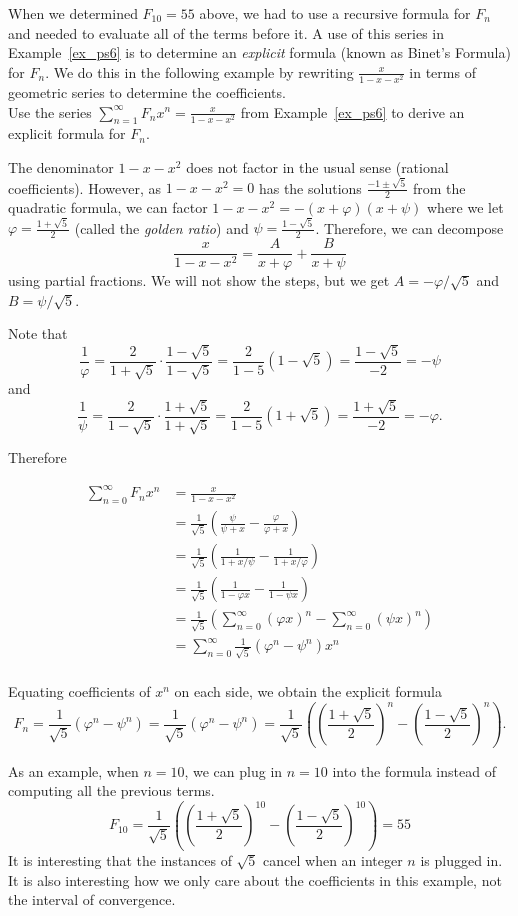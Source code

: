 When we determined $F_{10}=55$ above, we had to use a recursive formula for $F_n$ and needed to evaluate all of the terms before it.  A use of this series in Example~\ref{ex_ps6} is to determine an \emph{explicit} formula (known as Binet's Formula) for $F_n$.  We do this in the following example by rewriting $\frac{x}{1-x-x^2}$ in terms of geometric series to determine the coefficients.\\

{Use the series $\sum\limits_{n=1}^\infty F_n x^n = \frac{x}{1-x-x^2}$ from Example~\ref{ex_ps6} to derive an explicit formula for $F_n$.
}
{The denominator $1-x-x^2$ does not factor in the usual sense (rational coefficients).  However, as $1-x-x^2=0$ has the solutions $\frac{-1\pm\sqrt{5}}{2}$ from the quadratic formula, we can factor $1-x-x^2=-(x+\varphi)(x+{\psi})$ where we let $\varphi=\frac{1+\sqrt{5}}{2}$ (called the \emph{golden ratio}) and ${\psi}=\frac{1-\sqrt{5}}{2}$.  Therefore, we can decompose $$\frac{x}{1-x-x^2}=\frac{A}{x+\varphi}+\frac{B}{x+{\psi}}$$ using partial fractions.  We will not show the steps, but we get $A= - \varphi / \sqrt{5}$ and $B={\psi} / \sqrt{5}$.

Note that $$\frac{1}{\varphi}=\frac{2}{1+\sqrt{5}}\cdot\frac{1-\sqrt{5}}{1-\sqrt{5}} = \frac{2}{1-5}\left(1-\sqrt{5}\right) = \frac{1-\sqrt{5}}{-2}=
-{\psi}$$ and $$\frac{1}{{\psi}}=\frac{2}{1-\sqrt{5}}\cdot\frac{1+\sqrt{5}}{1+\sqrt{5}} = \frac{2}{1-5}\left(1+\sqrt{5}\right) = \frac{1+\sqrt{5}}{-2}=
-\varphi.$$

Therefore

\begin{align*}
\sum\limits_{n=0}^\infty F_n x^n &= \frac{x}{1-x-x^2}\\
&= \frac{1}{\sqrt{5}} \left( \frac{{\psi}}{{\psi}+x} - \frac{\varphi}{\varphi+x} \right)\\
&= \frac{1}{\sqrt{5}} \left( \frac{1}{1+x/{\psi}} - \frac{1}{1+x/\varphi} \right)\\
&= \frac{1}{\sqrt{5}} \left( \frac{1}{1-\varphi x} - \frac{1}{1-{\psi} x} \right)\\
&= \frac{1}{\sqrt{5}} \left(\sum_{n=0}^\infty (\varphi x)^n -  \sum_{n=0}^\infty (\psi x)^n\right)\\
&= \sum_{n=0}^\infty \frac{1}{\sqrt{5}}\left(\varphi^n - \psi^n\right) x^n\\
\end{align*}

Equating coefficients of $x^n$ on each side, we obtain the explicit formula $$F_n=\frac{1}{\sqrt{5}}\left(\varphi^n - \psi^n\right)=
\frac{1}{\sqrt{5}}\left(\varphi^n - \psi^n\right)=\frac{1}{\sqrt{5}}\left(\left(\frac{1+\sqrt{5}}{2}\right)^n - \left(\frac{1-\sqrt{5}}{2}\right)^n\right).$$

As an example, when $n=10$, we can plug in $n=10$ into the formula instead of computing all the previous terms.
$$F_{10}=\frac{1}{\sqrt{5}}\left(\left(\frac{1+\sqrt{5}}{2}\right)^{10} - \left(\frac{1-\sqrt{5}}{2}\right)^{10}\right)=55$$
It is interesting that the instances of $\sqrt{5}$ cancel when an integer $n$ is plugged in.  It is also interesting how we only care about the coefficients in this example, not the interval of convergence.
}



